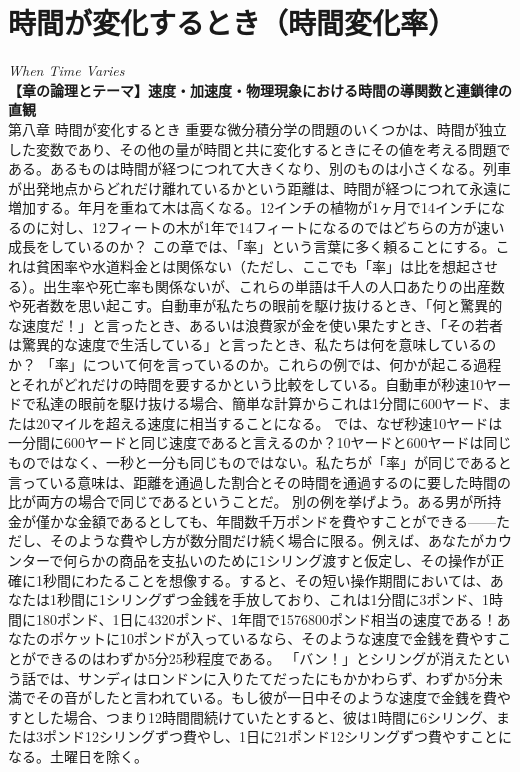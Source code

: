 \documentclass[a4paper,11pt,openany]{ltjsbook}
\begin{document}
\chapter{時間が変化するとき（時間変化率）}
\noindent\textit{\large When Time Varies}\\[2mm]
\noindent\textbf{\small 【章の論理とテーマ】速度・加速度・物理現象における時間の導関数と連鎖律の直観}\\[4mm]
第八章 時間が変化するとき
重要な微分積分学の問題のいくつかは、時間が独立した変数であり、その他の量が時間と共に変化するときにその値を考える問題である。あるものは時間が経つにつれて大きくなり、別のものは小さくなる。列車が出発地点からどれだけ離れているかという距離は、時間が経つにつれて永遠に増加する。年月を重ねて木は高くなる。12インチの植物が1ヶ月で14インチになるのに対し、12フィートの木が1年で14フィートになるのではどちらの方が速い成長をしているのか？
この章では、「率」という言葉に多く頼ることにする。これは貧困率や水道料金とは関係ない（ただし、ここでも「率」は比を想起させる）。出生率や死亡率も関係ないが、これらの単語は千人の人口あたりの出産数や死者数を思い起こす。自動車が私たちの眼前を駆け抜けるとき、「何と驚異的な速度だ！」と言ったとき、あるいは浪費家が金を使い果たすとき、「その若者は驚異的な速度で生活している」と言ったとき、私たちは何を意味しているのか？
「率」について何を言っているのか。これらの例では、何かが起こる過程とそれがどれだけの時間を要するかという比較をしている。自動車が秒速10ヤードで私達の眼前を駆け抜ける場合、簡単な計算からこれは1分間に600ヤード、または20マイルを超える速度に相当することになる。
では、なぜ秒速10ヤードは一分間に600ヤードと同じ速度であると言えるのか？10ヤードと600ヤードは同じものではなく、一秒と一分も同じものではない。私たちが「率」が同じであると言っている意味は、距離を通過した割合とその時間を通過するのに要した時間の比が両方の場合で同じであるということだ。
別の例を挙げよう。ある男が所持金が僅かな金額であるとしても、年間数千万ポンドを費やすことができる——ただし、そのような費やし方が数分間だけ続く場合に限る。例えば、あなたがカウンターで何らかの商品を支払いのために1シリング渡すと仮定し、その操作が正確に1秒間にわたることを想像する。すると、その短い操作期間においては、あなたは1秒間に1シリングずつ金銭を手放しており、これは1分間に3ポンド、1時間に180ポンド、1日に4320ポンド、1年間で1576800ポンド相当の速度である！あなたのポケットに10ポンドが入っているなら、そのような速度で金銭を費やすことができるのはわずか5分25秒程度である。
「バン！」とシリングが消えたという話では、サンディはロンドンに入りたてだったにもかかわらず、わずか5分未満でその音がしたと言われている。もし彼が一日中そのような速度で金銭を費やすとした場合、つまり12時間間続けていたとすると、彼は1時間に6シリング、または3ポンド12シリングずつ費やし、1日に21ポンド12シリングずつ費やすことになる。土曜日を除く。
\end{document}
